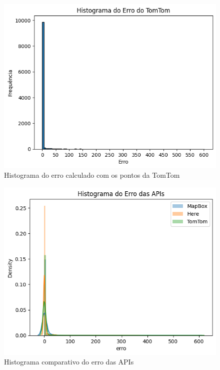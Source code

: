 \documentclass{article}
\begin{document}
\begin{figure}[h]
  \centering
  \includegraphics[width=\textwidth]{hist3.png}
  \caption{Histograma do erro calculado com os pontos da TomTom}
  \label{fig:hist3}
\end{figure}

\begin{figure}[h]
  \centering
  \includegraphics[width=\textwidth]{hist4.png}
  \caption{Histograma comparativo do erro das APIs}
  \label{fig:hist4}
\end{figure}
\end{document}
